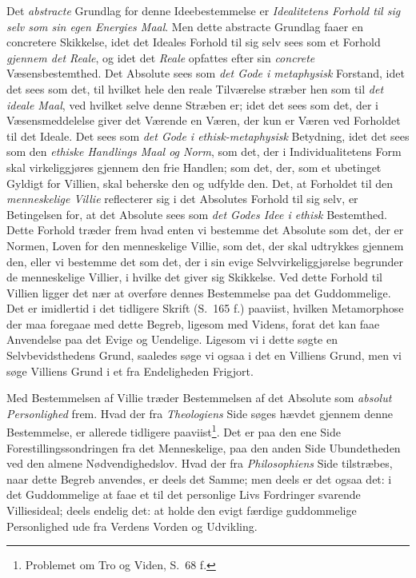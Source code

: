 Det \emph{abstracte} Grundlag for denne Ideebestemmelse er \emph{Idealitetens
Forhold til sig selv som sin egen Energies Maal}. Men dette abstracte Grundlag
faaer en concretere Skikkelse, idet det Ideales Forhold til sig selv sees som
et Forhold \emph{gjennem det Reale}, og idet det \emph{Reale} opfattes efter
sin \emph{concrete} Væsensbestemthed. Det Absolute sees som \emph{det Gode i
metaphysisk} Forstand, idet det sees som det, til hvilket hele den reale
Tilværelse stræber hen som til \emph{det ideale Maal}, ved hvilket selve denne
Stræben er; idet det sees som det, der i Væsensmeddelelse giver det Værende en
Væren, der kun er Væren ved Forholdet til det Ideale. Det sees som \emph{det
Gode i ethisk-metaphysisk} Betydning, idet det sees som den \emph{ethiske
Handlings Maal og Norm}, som det, der i Individualitetens Form skal
virkeliggjøres gjennem den frie Handlen; som det, der, som et ubetinget
Gyldigt for Villien, skal beherske den og udfylde den. Det, at Forholdet til
den \emph{menneskelige Villie} reflecterer sig i det Absolutes Forhold til sig
selv, er Betingelsen for, at det Absolute sees som \emph{det Godes Idee i
ethisk} Bestemthed. Dette Forhold træder frem hvad enten vi bestemme det
Absolute som det, der er Normen, Loven for den menneskelige Villie, som det,
der skal udtrykkes gjennem den, eller vi bestemme det som det, der i sin evige
Selvvirkeliggjørelse begrunder de menneskelige Villier, i hvilke det giver sig
Skikkelse. Ved dette Forhold til Villien ligger det nær at overføre dennes
Bestemmelse paa det Guddommelige. Det er imidlertid i det tidligere Skrift
(S.\ 165 f.) paaviist, hvilken Metamorphose der maa foregaae med dette Begreb,
ligesom med Videns, forat det kan faae Anvendelse paa det Evige og Uendelige.
Ligesom vi i dette søgte en Selvbevidsthedens Grund, saaledes søge vi ogsaa i
det en Villiens Grund, men vi søge Villiens Grund i et fra Endeligheden
Frigjort.

Med Bestemmelsen af Villie træder Bestemmelsen af det Absolute som
\emph{absolut Personlighed} frem. Hvad der
 \setcounter{footnote}{0}%
fra \emph{Theologiens} Side søges hævdet gjennem denne Bestemmelse, er
allerede tidligere paaviist\footnote{Problemet om Tro og Viden, S.\ 68 f.}.
Det er paa den ene Side Forestillingssondringen fra det Menneskelige, paa den
anden Side Ubundetheden ved den almene Nødvendighedslov. Hvad der fra
\emph{Philosophiens} Side tilstræbes, naar dette Begreb anvendes, er deels det
Samme; men deels er det ogsaa det: i det Guddommelige at faae et til det
personlige Livs Fordringer svarende Villiesideal; deels endelig det: at holde
den evigt færdige guddommelige Personlighed ude fra Verdens Vorden og
Udvikling.

